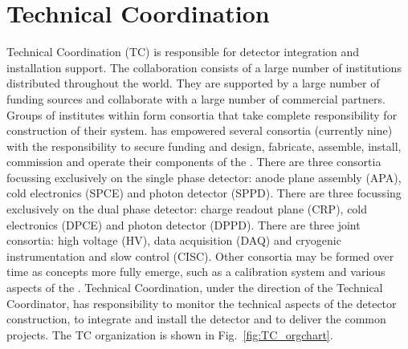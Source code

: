 \chapter{Technical Coordination}
\label{ch:fdsp-coord}

Technical Coordination (TC) is responsible for detector integration
and installation support. 
The  collaboration consists of a large number of
institutions distributed throughout the world. They are supported by a
large number of funding sources and collaborate with a large number of
commercial partners. Groups of institutes within  form
consortia that take complete responsibility for construction of their
system.   has empowered several consortia (currently nine)
with the responsibility to secure funding and design, fabricate,
assemble, install, commission and operate their components of the
 . There are three consortia focussing
exclusively on the single phase detector: anode plane assembly (APA),
cold electronics (SPCE) and photon detector (SPPD). There are three
focussing exclusively on the dual phase detector: charge readout plane
(CRP), cold electronics (DPCE) and photon detector (DPPD). There are
three joint consortia: high voltage (HV), data acquisition (DAQ) and
cryogenic instrumentation and slow control (CISC). Other consortia may
be formed over time as concepts more fully emerge, such as a
 calibration system and various aspects of the .
 Technical Coordination, under the direction of the
 Technical Coordinator, has responsibility to monitor the
technical aspects of the detector construction, to integrate and
install the detector and to deliver the common projects. The
 TC organization is shown in Fig.~\ref{fig:TC_orgchart}.
